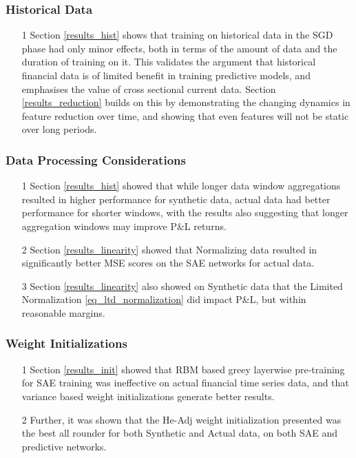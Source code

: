 \documentclass[a4paper,11pt,oneside]{article}
\theoremstyle{plain}
\theoremstyle{definition}
\begin{document}
	\subsubsection{Historical Data}
	\begin{itemize}
		\item[1] Section \ref{results_hist} shows that training on historical data in the SGD phase had only minor effects, both in terms of the amount of data and the duration of training on it. This validates the argument that historical financial data is of limited benefit in training predictive models, and emphasises the value of cross sectional current data. Section \ref{results_reduction} builds on this by demonstrating the changing dynamics in feature reduction over time, and showing that even features will not be static over long periods.
	\end{itemize}
	
	\subsubsection{Data Processing Considerations}
	\begin{itemize}
		\item[1] Section \ref{results_hist} showed that while longer data window aggregations resulted in higher performance for synthetic  data, actual data had better performance for shorter windows, with the results also suggesting that longer aggregation windows may improve P\&L returns.
		\item[2] Section \ref{results_linearity} showed that Normalizing data resulted in significantly better MSE scores on the SAE networks for actual data. 
		\item[3] Section \ref{results_linearity} also showed on Synthetic data that the Limited Normalization \eqref{eq_ltd_normalization} did impact P\&L, but within reasonable margins.
	\end{itemize}
	
	\subsubsection{Weight Initializations}
	\begin{itemize}
		\item[1] Section \ref{results_init} showed that RBM based greey layerwise pre-training for SAE training was ineffective on actual financial time series data, and that variance based weight initializations generate better results.
		\item[2] Further, it was shown that the He-Adj weight initialization presented was the best all rounder for both Synthetic and Actual data, on both SAE and predictive networks.
	\end{itemize}
	
\end{document}
